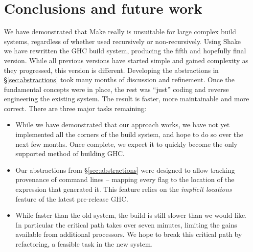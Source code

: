 \section{Conclusions and future work\label{section-conclusions}}

We have demonstrated that Make really is unsuitable for large complex build systems, regardless of whether used recursively or non-recursively. Using Shake we have rewritten the GHC build system, producing the fifth and hopefully final version. While all previous versions have started simple and gained complexity as they progressed, this version is different. Developing the abstractions in \S\ref{sec:abstractions} took many months of discussion and refinement. Once the fundamental concepts were in place, the rest was ``just'' coding and reverse engineering the existing system. The result is faster, more maintainable and more correct. There are three major tasks remaining:

\begin{itemize}
\item While we have demonstrated that our approach works, we have not yet implemented all the corners of the build system, and hope to do so over the next few months. Once complete, we expect it to quickly become the only supported method of building GHC.

\item Our abstractions from \S\ref{sec:abstractions} were designed to allow tracking provenance of command lines -- mapping every flag to the location of the expression that generated it. This feature relies on the \emph{implicit locations} feature of the latest pre-release GHC.

\item While faster than the old system, the build is still slower than we would like. In particular the critical path takes over seven minutes, limiting the gains available from additional processors. We hope to break this critical path by refactoring, a feasible task in the new system.
\end{itemize}
